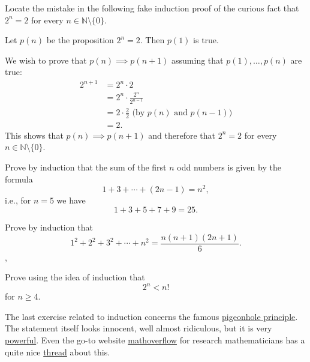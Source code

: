 \begin{exercise}
  Locate the mistake in the following fake induction proof of the curious fact that
  $2^n = 2$
  for every $n\in \mathbb{N}\setminus\{0\}$.

  Let $p(n)$ be
  the proposition $2^n = 2$. Then $p(1)$ is true.

  We wish to prove that $p(n) \implies p(n+1)$ assuming that $p(1), \dots, p(n)$ are true:
  \begin{align*}
    2^{n+1} & = 2^n \cdot 2                                                      \\
            & = 2^n \cdot \frac{2^n}{2^{n-1}}                                    \\
            & = 2 \cdot \frac{2}{2}\,\,\text{(by }p(n)\text{ and }p(n-1)\text{)} \\
            & = 2.
  \end{align*}
  This shows that $p(n) \implies p(n+1)$ and therefore that $2^n = 2$ for every
  $n\in \mathbb{N}\setminus\{0\}$.
\end{exercise}

\begin{exercise}
  Prove by induction that the sum of the first $n$ odd numbers is
  given by the formula
  $$
    1 + 3 + \cdots + (2 n - 1) = n^2,
  $$
  i.e., for $n=5$ we have
  $$
    1 + 3 + 5 + 7 + 9 = 25.
  $$
\end{exercise}

\begin{exercise}
  Prove by induction that
  $$
    1^2 + 2^2 + 3^2 + \cdots + n^2 = \frac{n(n+1)(2n + 1)}{6}.
  $$,
\end{exercise}

\begin{exercise}
  Prove using the idea of induction that
  $$
    2^n < n!
  $$
  for $n\geq 4$.

\end{exercise}

The last exercise related to induction concerns the famous \href{https://en.wikipedia.org/wiki/Pigeonhole\_principle}{pigeonhole principle}. The statement itself looks innocent, well almost ridiculous, but it is very \href{https://mindyourdecisions.com/blog/2008/11/25/16-fun-applications-of-the-pigeonhole-principle/}{powerful}. Even the go-to website
\href{https://mathoverflow.net/}{mathoverflow} for research mathematicians has
a quite nice \href{https://mathoverflow.net/questions/4279/interesting-applications-of-the-pigeonhole-principle}{thread}
about this.

